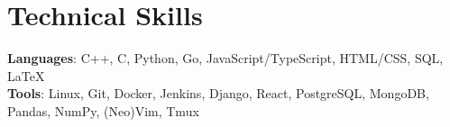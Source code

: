 \documentclass[letterpaper,11pt]{article}
\begin{document}
\section{Technical Skills}
\textbf{Languages}: C++, C, Python, Go, JavaScript/TypeScript, HTML/CSS, SQL,
\LaTeX \\
\textbf{Tools}: Linux, Git, Docker, Jenkins, Django, React,
PostgreSQL, MongoDB, Pandas, NumPy, (Neo)Vim, Tmux
\end{document}
